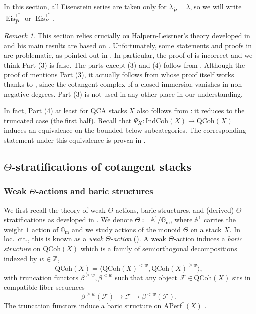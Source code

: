 \documentclass{amsart}
\theoremstyle{definition}
\theoremstyle{remark}
\newtheorem{remark}[theorem]{Remark}
\numberwithin{equation}{section}
\newcommand{\mc}{\mathcal}
\newcommand{\A}{\mathbb{A}}
\newcommand{\Z}{\mathbb{Z}}
\newcommand{\Gm}{{\mathbb{G}_{\mathrm{m}}}}
\newcommand{\wh}{\widehat}
\newcommand{\IndCoh}{\mathrm{IndCoh}}
\newcommand{\QCoh}{\mathrm{QCoh}}
\DeclareMathOperator{\Eis}{\mathrm{Eis}}
\newcommand{\T}{\mathbb{T}}
\newcommand{\Aperf}{\mathrm{APerf}}
\begin{document}
In this section, all Eisenstein series are taken only for $\lambda_{\wh{P}}=\lambda$, so we will write $\Eis^{\T^*}_{\wh P}$ or $\Eis^{\T^*}_{P}$. 

\begin{remark}
This section relies crucially on Halpern-Leistner's theory developed in \cite{HalpernLeistner} and his main results are based on \cite[Appendix A]{HalpernLeistner}. Unfortunately, some statements and proofs in \cite[Appendix A]{HalpernLeistner} are problematic, as pointed out in \cite[Remark 2.5.13(i)]{HansenMann}. In particular, the proof of \cite[Theorem A.0.1]{HalpernLeistner} is incorrect and we think Part (3) is false. The parts except (3) and (4) follow from \cite[Proposition 2.5.12]{HansenMann}. Although the proof of \cite[Corollary A.0.1.1(1)]{HalpernLeistner} mentions Part (3), it actually follows from \cite[Corollary A.0.1.1(2)]{HalpernLeistner} whose proof itself works thanks to \cite[Proposition 2.5.12]{HansenMann}, since the cotangent complex of a closed immersion vanishes in non-negative degrees. Part (3) is not used in any other place in our understanding. 

In fact, Part (4) at least for QCA stacks $X$ also follows from \cite{HansenMann}: it reduces to the truncated case (the first half). Recall that $\Psi_X\colon \IndCoh(X)\to \QCoh(X)$ induces an equivalence on the bounded below subcategories. The corresponding statement under this equivalence is proven in \cite[Theorem 2.10.7]{HansenMann}.
\end{remark}

\subsection{$\Theta$-stratifications of cotangent stacks}

\subsubsection{Weak $\Theta$-actions and baric structures}{\label{sss: derivedtheta strat}}
We first recall the theory of weak $\Theta$-actions, baric structures, and (derived) $\Theta$-stratifications as developed in \cite{HalpernLeistner}. We denote $\Theta \coloneq \A^1/ \Gm$, where $\A^1$ carries the weight $1$ action of $\Gm$ and we study actions of the monoid $\Theta$ on a stack $X$. In loc.~cit., this is known as a \emph{weak} $\Theta$-\emph{action} (\cite[Definition 1.1.1]{HalpernLeistner}). A weak $\Theta$-action induces a \emph{baric structure} on $\QCoh(X)$ which is a family of semiorthogonal decompositions indexed by $w \in \Z$,
\begin{equation*}
    \QCoh(X) = \langle \QCoh(X)^{<w}, \QCoh(X)^{\geq w}\rangle,
\end{equation*}
with truncation functors $\beta^{\geq w}, \beta^{<w}$ such that any object $\mc{F} \in \QCoh(X)$ sits in compatible fiber sequences
\begin{equation*}
    \beta^{\geq w}(\mc{F}) \rightarrow \mc{F} \rightarrow \beta^{<w}(\mc{F}).
\end{equation*}
The truncation functors induce a baric structure on $\Aperf^*(X)$ \cite[Proposition 1.1.2]{HalpernLeistner}.
\end{document}

